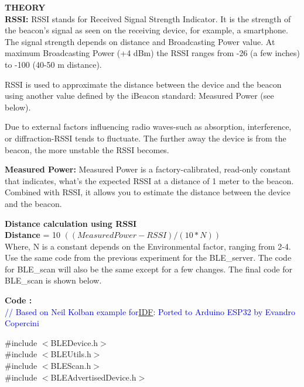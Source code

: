\documentclass[12pt,a4paper]{article}
\begin{document}
\begin{justify}
\textbf{\large THEORY}\\[3pt]
\textbf{RSSI: }  RSSI stands for Received Signal Strength Indicator. It is the strength of the beacon's signal as seen on the receiving device, for example, a smartphone. The signal strength depends on distance and Broadcasting Power value. At maximum Broadcasting Power (+4 dBm) the \noindent RSSI ranges from -26 (a few inches) to -100 (40-50 m distance).\par
\noindent RSSI is used to approximate the distance between the device and the beacon using another value defined by the iBeacon standard: Measured Power (see below).\par
\noindent Due to external factors influencing radio waves-such as absorption, interference, or diffraction-RSSI tends to fluctuate. The further away the device is from the beacon, the more unstable the RSSI becomes.\par
\noindent \textbf{Measured Power: } Measured Power is a factory-calibrated, read-only constant that indicates, what's the expected RSSI at a distance of 1 meter to the beacon. Combined with RSSI, it allows you to estimate the distance between the device and the beacon.\par

\noindent \textbf{Distance calculation using RSSI}\\
\textbf{Distance} = 10 \wedge $((Measured Power-RSSI)/(10 * N))$ \\

Where,  N is a constant depends on the Environmental factor, ranging from 2-4.\\

\noindent Use the same code from the previous experiment for the BLE\_server. The code for BLE\_scan will also be the same except for a few changes. The final code for BLE\_scan is shown below.\\ [3cm]
\end{justify}

\textbf{\large Code :}\\[3pt]


 \textcolor{blue}{//
   Based on Neil Kolban example for\href{https://github.com/nkolban/esp32-snippets/blob/master/cpp_utils/tests/BLE\%20Tests/SampleScan.cpp}{IDF}: 
   Ported to Arduino ESP32 by Evandro Copercini}

\noindent \#include $<$BLEDevice.h$>$\\
\#include $<$BLEUtils.h$>$\\
\#include $<$BLEScan.h$>$\\
\#include $<$BLEAdvertisedDevice.h$>$\\[8pt]
\end{document}
